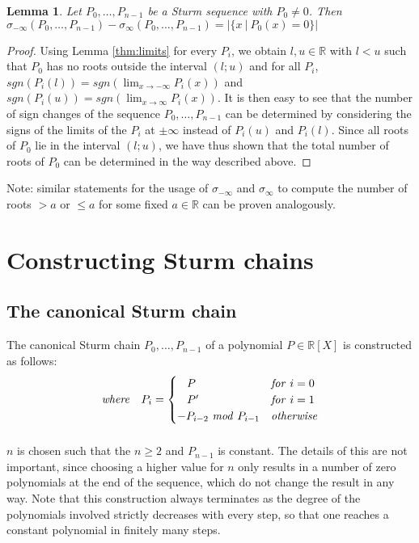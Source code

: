 \documentclass[11pt,a4paper,oneside]{article}
\newtheorem{lemma}[definition]{Lemma}
\newcommand{\RR}{\mathbb{R}}
\newcommand{\sgn}{\mathit{sgn}}
\begin{document}
\begin{lemma}\label{thm:count_roots}
Let $P_0,\ldots,P_{n-1}$ be a Sturm sequence with $P_0\neq 0$. Then $\sigma_{-\infty}(P_0,\ldots,P_{n-1})-\sigma_\infty(P_0,\ldots,P_{n-1}) = |\{x\ |\ P_0(x)=0\}|$
\end{lemma}
\begin{proof}
Using Lemma \ref{thm:limits} for every $P_i$, we obtain $l,u\in\RR$ with $l<u$ such that $P_0$ has no roots outside the interval $(l;u)$ and for all $P_i$, $\sgn(P_i(l))=\sgn(\lim_{x\to -\infty} P_i(x))$ and $\sgn(P_i(u))=\sgn(\lim_{x\to \infty} P_i(x))$. It is then easy to see that the number of sign changes of the sequence $P_0,\ldots,P_{n-1}$ can be determined by considering the signs of the limits of the $P_i$ at $\pm\infty$ instead of $P_i(u)$ and $P_i(l)$. Since all roots of $P_0$ lie in the interval $(l;u)$, we have thus shown that the total number of roots of $P_0$ can be determined in the way described above.
\end{proof}

Note: similar statements for the usage of $\sigma_{-\infty}$ and $\sigma_\infty$ to compute the number of roots $>a$ or $\leq a$ for some fixed $a\in\RR$ can be proven analogously.

\section{Constructing Sturm chains}

\subsection{The canonical Sturm chain}

The canonical Sturm chain $P_0,\ldots,P_{n-1}$ of a polynomial $P\in\RR[X]$ is constructed as follows:
\begin{align*}
&&\mathit{where}\quad &P_i = \begin{cases}
\hskip3mm P & \mathit{for}\ i = 0\\
\hskip3mm P' & \mathit{for}\ i = 1\\
-P_{i-2}\ \mathit{mod}\ P_{i-1} &\mathit{otherwise}
\end{cases}&\\[2mm]
\end{align*}

$n$ is chosen such that the $n\geq 2$ and $P_{n-1}$ is constant. The details of this are not important, since choosing a higher value for $n$ only results in a number of zero polynomials at the end of the sequence, which do not change the result in any way. Note that this construction always terminates as the degree of the polynomials involved strictly decreases with every step, so that one reaches a constant polynomial in finitely many steps.\\
\end{document}
